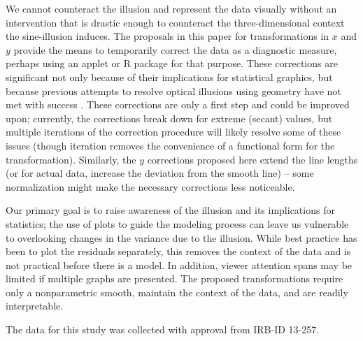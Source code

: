 \documentclass[12pt]{article}\usepackage[]{graphicx}\usepackage[]{color}
\begin{document}
We cannot counteract the illusion and represent the data visually without an intervention that is drastic enough to counteract the three-dimensional context the sine-illusion induces. The proposals in this paper for transformations in $x$ and $y$ provide the means to temporarily correct the data as a diagnostic measure, perhaps using an applet or R package for that purpose. These corrections are significant not only because of their implications for statistical graphics, but because previous attempts to resolve optical illusions using geometry have not met with success \citep{westheimer2008illusions}. These corrections are only a first step and could be improved upon; currently, the corrections break down for extreme (secant) values, but multiple iterations of the correction procedure will likely resolve some of these issues (though iteration removes the convenience of a functional form for the transformation). Similarly, the $y$ corrections proposed here extend the line lengths (or for actual data, increase the deviation from the smooth line) -- some normalization might make the necessary corrections less noticeable. 

Our primary goal is to raise awareness of the illusion and its implications for statistics; the use of plots to guide the modeling process can leave us vulnerable to overlooking changes in the variance due to the illusion. While best practice has  been to plot the residuals separately, this removes the context of the data and is not practical before there is a model. In addition, viewer attention spans may be limited if multiple graphs are presented. The proposed transformations require only a nonparametric smooth, maintain the context of the data, and are readily interpretable. 

The data for this study was collected with approval from  IRB-ID 13-257.
\end{document}
